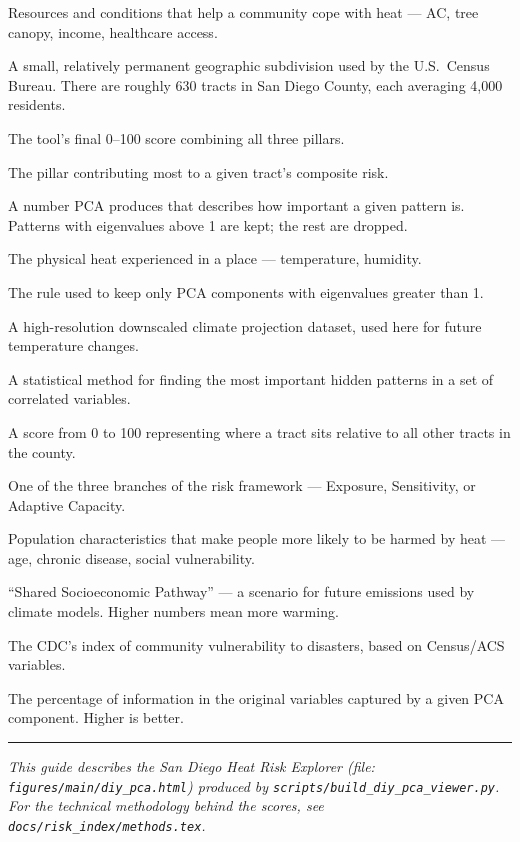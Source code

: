 \documentclass[11pt]{article}
\begin{document}
\begin{description}[style=nextline]
  \item[Adaptive Capacity] Resources and conditions that help a community
        cope with heat --- AC, tree canopy, income, healthcare access.
  \item[Census Tract] A small, relatively permanent geographic subdivision
        used by the U.S.\ Census Bureau. There are roughly 630 tracts in
        San Diego County, each averaging 4,000 residents.
  \item[Composite Risk] The tool's final 0--100 score combining all three
        pillars.
  \item[Dominant Driver] The pillar contributing most to a given tract's
        composite risk.
  \item[Eigenvalue] A number PCA produces that describes how important a
        given pattern is. Patterns with eigenvalues above 1 are kept; the
        rest are dropped.
  \item[Exposure] The physical heat experienced in a place ---
        temperature, humidity.
  \item[Kaiser Criterion] The rule used to keep only PCA components with
        eigenvalues greater than 1.
  \item[LOCA2] A high-resolution downscaled climate projection dataset,
        used here for future temperature changes.
  \item[PCA (Principal Component Analysis)] A statistical method for
        finding the most important hidden patterns in a set of correlated
        variables.
  \item[Percentile Rank] A score from 0 to 100 representing where a tract
        sits relative to all other tracts in the county.
  \item[Pillar] One of the three branches of the risk framework ---
        Exposure, Sensitivity, or Adaptive Capacity.
  \item[Sensitivity] Population characteristics that make people more
        likely to be harmed by heat --- age, chronic disease, social
        vulnerability.
  \item[SSP] ``Shared Socioeconomic Pathway'' --- a scenario for future
        emissions used by climate models. Higher numbers mean more warming.
  \item[SVI (Social Vulnerability Index)] The CDC's index of community
        vulnerability to disasters, based on Census/ACS variables.
  \item[Variance Explained] The percentage of information in the original
        variables captured by a given PCA component. Higher is better.
\end{description}

\vspace{1em}
\hrule
\vspace{1em}

\noindent\textit{This guide describes the San Diego Heat Risk Explorer
(file: \texttt{figures/main/diy\_pca.html}) produced by
\texttt{scripts/build\_diy\_pca\_viewer.py}. For the technical methodology
behind the scores, see \texttt{docs/risk\_index/methods.tex}.}
\end{document}
